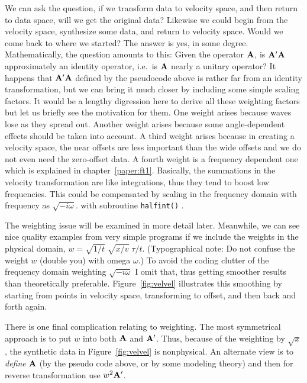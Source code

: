 \par
We can ask the question, if we transform data to velocity space,
and then return to data space,
will we get the original data?
Likewise we could begin from the velocity space,
synthesize some data, and return to velocity space.
Would we come back to where we started?
The answer is yes, in some degree.
Mathematically, the question amounts to this:
Given the operator $\bold A$, is $\bold A'\bold A$ approximately
an identity operator, i.e.~is $\bold A$ nearly a unitary operator?
It happens that $\bold A'\bold A$ defined by the pseudocode above
is rather far from an identity transformation,
but we can bring it much closer
by including some simple scaling factors.
It would be a lengthy digression here to derive all these weighting factors
but let us briefly see the motivation for them.
One weight arises because waves lose  as they spread out.
Another weight arises because some angle-dependent effects should be taken
into account.  A third weight arises because in creating a velocity space,
the near offsets are less important than the wide offsets
and we do not even need the zero-offset data.
A fourth weight is a frequency dependent one
which is explained in chapter~\ref{paper:ft1}.
Basically, the summations in the velocity transformation are like integrations,
thus they tend to boost low frequencies.
This could be compensated by scaling
in the frequency domain
with frequency as $\sqrt{-i\omega}$.
 with subroutine \texttt{halfint()} .

\par
The weighting issue will be examined in more detail later.
Meanwhile, we can see nice quality examples
from very simple programs
if we include the weights
in the physical domain, $w= \sqrt{1/t}\; \sqrt{x/v}\; \tau /t $.
(Typographical note:  Do not confuse
the weight $w$ (double you) with omega $\omega$.)
To avoid the coding clutter of the frequency domain weighting
$\sqrt{-i\omega}$ I omit that,
thus getting smoother results than theoretically preferable.
Figure~\ref{fig:velvel} illustrates this smoothing by starting
from points in velocity space, transforming to offset,
and then back and forth again.


\par
There is one final complication relating to weighting.
The most symmetrical approach is to put
$w$ into both $\bold A$ and $\bold A'$.
Thus, because of the weighting by $\sqrt{x}$,
the synthetic data in Figure~\ref{fig:velvel} is
nonphysical.
An alternate view is to {\em  define} $\bold A$
(by the pseudo code above, or by some modeling theory)
and then for reverse transformation
use $w^2\bold A'$.

